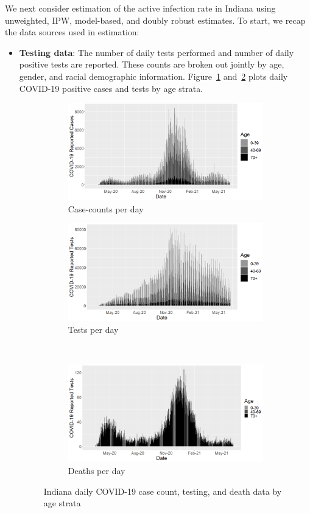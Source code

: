 \documentclass[11pt]{amsart}
\numberwithin{equation}{section}
\theoremstyle{plain}
\begin{document}
 We next consider estimation of the active infection rate in Indiana using unweighted, IPW, model-based, and doubly robust estimates. To start, we recap the data sources used in estimation:
 \begin{itemize}[leftmargin=*]
 \item {\bf Testing data}:  The number of daily tests performed and number of daily positive tests are reported.  These counts are broken out jointly by age, gender, and racial demographic information.  Figure~\ref{fig:in-cases} and~\ref{fig:in-tests} plots daily COVID-19 positive cases and tests by age strata.

 \begin{figure}
 \centering
 \begin{subfigure}{.45\textwidth}
  \centering
  \includegraphics[width=.9\linewidth]{../figs/indianacasecounts_byage.png}
  \caption{Case-counts per day}
  \label{fig:in-cases}
 \end{subfigure}
 \begin{subfigure}{.45\textwidth}
  \centering
  \includegraphics[width=.9\linewidth]{../figs/indianacovidtests_byage.png}
 \caption{Tests per day}
 \label{fig:in-tests}
 \end{subfigure} \\ [1ex]
 \begin{subfigure}{\linewidth}
 \centering
 \includegraphics[width=.45\linewidth]{../figs/indianadeaths_byage.png}
  \caption{Deaths per day}
  \label{fig:in-deaths}
 \end{subfigure}
 \caption{Indiana daily COVID-19 case count, testing, and death data by age strata}
 \label{fig:in-data}
 \end{figure}


\end{itemize}
\end{document}
